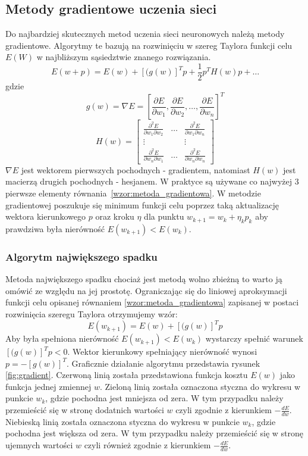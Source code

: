 \subsection{Metody gradientowe uczenia sieci}
Do najbardziej skutecznych metod uczenia sieci neuronowych należą metody gradientowe. Algorytmy te bazują na rozwinięciu w szereg Taylora funkcji celu $E(W)$ w najbliższym sąsiedztwie znanego rozwiązania\cite{Osowski}.
\begin{equation}
	\label{wzor:metoda_gradientowa}
	E(w + p) = E(w) + [(g(w)]^Tp + \frac{1}{2}p^TH(w)p + \hdots
\end{equation}
gdzie
$$g(w) = \nabla E = [\frac{\partial E}{\partial w_1}, \frac{\partial E}{\partial w_2}, \hdots, \frac{\partial E}{\partial w_n}]^T$$
$$H(w) = \begin{bmatrix}
\frac{\partial^2 E}{\partial w_1 \partial w_2} & \hdots & \frac{\partial^2 E}{\partial w_1 \partial w_n}\\
\vdots & & \vdots \\
\frac{\partial^2 E}{\partial w_n \partial w_1} & \hdots & \frac{\partial^2 E}{\partial w_n \partial w_n}
\end{bmatrix}$$
$\nabla E$ jest wektorem pierwszych pochodnych - gradientem, natomiast $H(w)$ jest macierzą drugich pochodnych - hesjanem. W praktyce są używane co najwyżej 3 pierwsze elementy równania~\ref{wzor:metoda_gradientowa}. W metodzie gradientowej poszukuje się minimum funkcji celu poprzez taką aktualizację wektora kierunkowego $p$ oraz kroku $\eta$ dla punktu $w_{k+1} = w_k + \eta_k p_k$ aby prawdziwa była nierówność $E(w_{k+1}) < E(w_k)$.

\subsubsection*{Algorytm największego spadku}
Metoda największego spadku chociaż jest metodą wolno zbieżną to warto ją omówić ze względu na jej prostotę. Ograniczając się do liniowej aproksymacji funkcji celu opisanej równaniem \ref{wzor:metoda_gradientowa} zapisanej w postaci rozwinięcia szeregu Taylora otrzymujemy wzór:
\begin{equation}
	E(w_{k+1}) = E(w) + [(g(w)]^Tp
\end{equation} 
Aby była spełniona nierówność $E(w_{k+1}) < E(w_k)$ wystarczy spełnić warunek $[(g(w)]^Tp < 0$. Wektor kierunkowy spełniający nierówność wynosi $p = -[g(w)]^T$. Graficznie działanie algorytmu przedstawia rysunek \ref{fig:gradient}. Czerwoną linią została przedstawiona funkcja kosztu $E(w)$ jako funkcja jednej zmiennej $w$. Zieloną linią została oznaczona styczna do wykresu w punkcie $w_k$, gdzie pochodna jest mniejsza od zera. W tym przypadku należy przemieścić się w stronę dodatnich wartości $w$ czyli zgodnie z kierunkiem $-\frac{dE}{dw}$. Niebieską linią została oznaczona styczna do wykresu w punkcie $w_k$, gdzie pochodna jest większa od zera. W tym przypadku należy przemieścić się w stronę ujemnych wartości $w$ czyli również zgodnie z kierunkiem $-\frac{dE}{dw}$.

